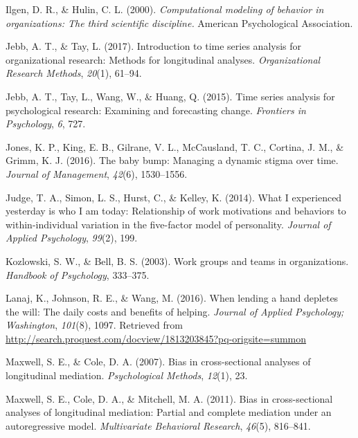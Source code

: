\documentclass[english,,man]{apa6}
\theoremstyle{definition}
\theoremstyle{definition}
\theoremstyle{definition}
\theoremstyle{remark}
\begin{document}
\leavevmode\hypertarget{ref-ilgen_computational_2000}{}%
Ilgen, D. R., \& Hulin, C. L. (2000). \emph{Computational modeling of
behavior in organizations: The third scientific discipline.} American
Psychological Association.

\leavevmode\hypertarget{ref-jebb_introduction_2017}{}%
Jebb, A. T., \& Tay, L. (2017). Introduction to time series analysis for
organizational research: Methods for longitudinal analyses.
\emph{Organizational Research Methods}, \emph{20}(1), 61--94.

\leavevmode\hypertarget{ref-jebb_time_2015}{}%
Jebb, A. T., Tay, L., Wang, W., \& Huang, Q. (2015). Time series
analysis for psychological research: Examining and forecasting change.
\emph{Frontiers in Psychology}, \emph{6}, 727.

\leavevmode\hypertarget{ref-jones_baby_2016}{}%
Jones, K. P., King, E. B., Gilrane, V. L., McCausland, T. C., Cortina,
J. M., \& Grimm, K. J. (2016). The baby bump: Managing a dynamic stigma
over time. \emph{Journal of Management}, \emph{42}(6), 1530--1556.

\leavevmode\hypertarget{ref-judge_what_2014}{}%
Judge, T. A., Simon, L. S., Hurst, C., \& Kelley, K. (2014). What I
experienced yesterday is who I am today: Relationship of work
motivations and behaviors to within-individual variation in the
five-factor model of personality. \emph{Journal of Applied Psychology},
\emph{99}(2), 199.

\leavevmode\hypertarget{ref-kozlowski_work_2003}{}%
Kozlowski, S. W., \& Bell, B. S. (2003). Work groups and teams in
organizations. \emph{Handbook of Psychology}, 333--375.

\leavevmode\hypertarget{ref-lanaj_when_2016}{}%
Lanaj, K., Johnson, R. E., \& Wang, M. (2016). When lending a hand
depletes the will: The daily costs and benefits of helping.
\emph{Journal of Applied Psychology; Washington}, \emph{101}(8), 1097.
Retrieved from
\url{http://search.proquest.com/docview/1813203845?pq-origsite=summon}

\leavevmode\hypertarget{ref-maxwell2007bias}{}%
Maxwell, S. E., \& Cole, D. A. (2007). Bias in cross-sectional analyses
of longitudinal mediation. \emph{Psychological Methods}, \emph{12}(1),
23.

\leavevmode\hypertarget{ref-maxwell2011bias}{}%
Maxwell, S. E., Cole, D. A., \& Mitchell, M. A. (2011). Bias in
cross-sectional analyses of longitudinal mediation: Partial and complete
mediation under an autoregressive model. \emph{Multivariate Behavioral
Research}, \emph{46}(5), 816--841.
\end{document}
